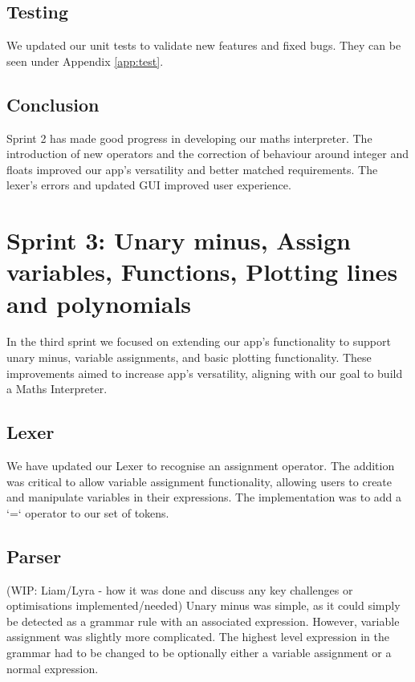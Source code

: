 \documentclass[a4paper, oneside, 11pt]{report}
\begin{document}
\subsection{Testing}
We updated our unit tests to validate new features and fixed bugs. They can be seen under Appendix \ref{app:test}.

\subsection{Conclusion}
Sprint 2 has made good progress in developing our maths interpreter. The introduction of new operators and the correction of behaviour around integer and floats improved our app's versatility and better matched requirements. The lexer's errors and updated GUI improved user experience.


\section{Sprint 3: Unary minus, Assign variables, Functions, Plotting lines and polynomials}
In the third sprint we focused on extending our app’s functionality to support unary minus, variable assignments, and basic plotting functionality. These improvements aimed to increase app’s versatility, aligning with our goal to build a Maths Interpreter.

\subsection{Lexer}
We have updated our Lexer to recognise an assignment operator. The addition was critical to allow variable assignment functionality, allowing users to create and manipulate variables in their expressions. The implementation was to add a ‘=‘ operator to our set of tokens.

\subsection{Parser}
(WIP: Liam/Lyra - how it was done and discuss any key challenges or optimisations implemented/needed)
Unary minus was simple, as it could simply be detected as a grammar rule with an associated expression. However, variable assignment was slightly more complicated. The highest level expression in the grammar had to be changed to be optionally either a variable assignment or a normal expression.
\end{document}
